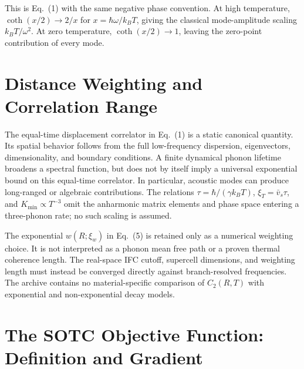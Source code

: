\documentclass[aps,prb,reprint,amsmath,amssymb,floatfix]{revtex4-2}
\begin{document}
\color{revisionblue}
This is Eq.~(1) with the same negative phase convention. At high temperature,
\(\coth(x/2)\to2/x\) for \(x=\hbar\omega/k_BT\), giving the classical
mode-amplitude scaling \(k_BT/\omega^2\). At zero temperature,
\(\coth(x/2)\to1\), leaving the zero-point contribution of every mode.
\color{black}

\color{revisionblue}
\section{Distance Weighting and Correlation Range}
\label{appendix-b-thermal-coherence-length}
\color{black}

\color{revisionblue}
The equal-time displacement correlator in Eq.~(1) is a static canonical
quantity. Its spatial behavior follows from the full low-frequency dispersion,
eigenvectors, dimensionality, and boundary conditions. A finite dynamical
phonon lifetime broadens a spectral function, but does not by itself imply a
universal exponential bound on this equal-time correlator. In particular,
acoustic modes can produce long-ranged or algebraic contributions. The relations
\(\tau=\hbar/(\gamma k_BT)\),
\(\xi_T=\bar v_s\tau\), and
\(K_{\min}\propto T^{-3}\) omit the anharmonic matrix elements and phase
space entering a three-phonon rate; no such scaling is assumed.
\color{black}

\color{revisionblue}
The exponential \(w(R;\xi_w)\) in Eq.~(5) is retained only as a numerical
weighting choice. It is not interpreted as a phonon mean free path or a proven
thermal coherence length. The real-space IFC cutoff, supercell dimensions, and
weighting length must instead be converged directly against branch-resolved
frequencies. The archive contains no material-specific comparison of
\(C_2(R,T)\) with exponential and non-exponential decay models.
\color{black}

\color{revisionblue}
\section{The SOTC Objective Function: Definition and
Gradient}\label{appendix-c-the-sotc-objective-functional-derivation-and-gradient}
\color{black}
\end{document}
